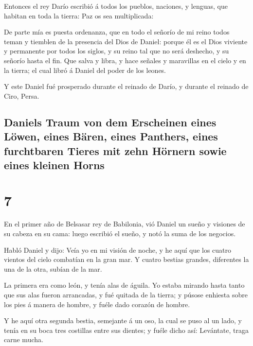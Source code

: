  Entonces el rey Darío escribió á todos los pueblos,
naciones, y lenguas, que habitan en toda la tierra: Paz os sea
multiplicada:

 De parte mía es puesta ordenanza, que en todo el señorío
de mi reino todos teman y tiemblen de la presencia del Dios de Daniel:
porque él es el Dios viviente y permanente por todos los siglos, y su
reino tal que no será deshecho, y su señorío hasta el fin.
 Que salva y libra, y hace señales y maravillas en el
cielo y en la tierra; el cual libró á Daniel del poder de los leones.

 Y este Daniel fué prosperado durante el reinado de
Darío, y durante el reinado de Ciro, Persa.

\hypertarget{daniels-traum-von-dem-erscheinen-eines-luxf6wen-eines-buxe4ren-eines-panthers-eines-furchtbaren-tieres-mit-zehn-huxf6rnern-sowie-eines-kleinen-horns}{%
\subsection{Daniels Traum von dem Erscheinen eines Löwen, eines Bären,
eines Panthers, eines furchtbaren Tieres mit zehn Hörnern sowie eines
kleinen
Horns}\label{daniels-traum-von-dem-erscheinen-eines-luxf6wen-eines-buxe4ren-eines-panthers-eines-furchtbaren-tieres-mit-zehn-huxf6rnern-sowie-eines-kleinen-horns}}

\hypertarget{section-27-7}{%
\section{7}\label{section-27-7}}

 En el primer año de Belsasar rey de Babilonia, vió Daniel
un sueño y visiones de su cabeza en su cama: luego escribió el sueño, y
notó la suma de los negocios.

 Habló Daniel y dijo: Veía yo en mi visión de noche, y he
aquí que los cuatro vientos del cielo combatían en la gran mar.
 Y cuatro bestias grandes, diferentes la una de la otra,
subían de la mar.

 La primera era como león, y tenía alas de águila. Yo
estaba mirando hasta tanto que sus alas fueron arrancadas, y fué quitada
de la tierra; y púsose enhiesta sobre los pies á manera de hombre, y
fuéle dado corazón de hombre.

 Y he aquí otra segunda bestia, semejante á un oso, la
cual se puso al un lado, y tenía en su boca tres costillas entre sus
dientes; y fuéle dicho así: Levántate, traga carne mucha.

